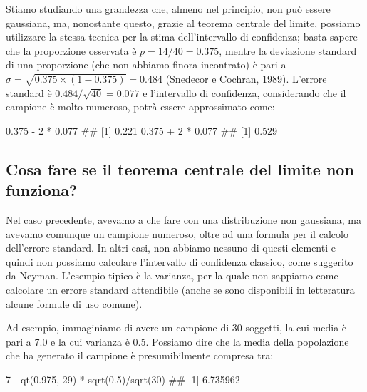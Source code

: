 \documentclass[a4paper,12pt,oneside]{book}
\newenvironment{Shaded}{\begin{snugshade}}{\end{snugshade}}
\newcommand{\DecValTok}[1]{#1}
\newcommand{\FloatTok}[1]{#1}
\newcommand{\SpecialCharTok}[1]{#1}
\newcommand{\DocumentationTok}[1]{#1}
\newcommand{\FunctionTok}[1]{#1}
\newcommand{\NormalTok}[1]{#1}
\begin{document}
Stiamo studiando una grandezza che, almeno nel principio, non può essere gaussiana, ma, nonostante questo, grazie al teorema centrale del limite, possiamo utilizzare la stessa tecnica per la stima dell'intervallo di confidenza; basta sapere che la proporzione osservata è \(p = 14/40 = 0.375\), mentre la deviazione standard di una proporzione (che non abbiamo finora incontrato) è pari a \(\sigma = \sqrt{0.375 \times (1 - 0.375)} = 0.484\) (Snedecor e Cochran, 1989). L'errore standard è \(0.484 / \sqrt{40} = 0.077\) e l'intervallo di confidenza, considerando che il campione è molto numeroso, potrà essere approssimato come:

\begin{Shaded}
\begin{Highlighting}[]
\FloatTok{0.375} \SpecialCharTok{{-}} \DecValTok{2} \SpecialCharTok{*} \FloatTok{0.077}
\DocumentationTok{\#\# [1] 0.221}
\FloatTok{0.375} \SpecialCharTok{+} \DecValTok{2} \SpecialCharTok{*} \FloatTok{0.077}
\DocumentationTok{\#\# [1] 0.529}
\end{Highlighting}
\end{Shaded}

\hypertarget{cosa-fare-se-il-teorema-centrale-del-limite-non-funziona}{%
\subsection{Cosa fare se il teorema centrale del limite non funziona?}\label{cosa-fare-se-il-teorema-centrale-del-limite-non-funziona}}

Nel caso precedente, avevamo a che fare con una distribuzione non gaussiana, ma avevamo comunque un campione numeroso, oltre ad una formula per il calcolo dell'errore standard. In altri casi, non abbiamo nessuno di questi elementi e quindi non possiamo calcolare l'intervallo di confidenza classico, come suggerito da Neyman. L'esempio tipico è la varianza, per la quale non sappiamo come calcolare un errore standard attendibile (anche se sono disponibili in letteratura alcune formule di uso comune).

Ad esempio, immaginiamo di avere un campione di 30 soggetti, la cui media è pari a 7.0 e la cui varianza è 0.5. Possiamo dire che la media della popolazione che ha generato il campione è presumibilmente compresa tra:

\begin{Shaded}
\begin{Highlighting}[]
\DecValTok{7} \SpecialCharTok{{-}} \FunctionTok{qt}\NormalTok{(}\FloatTok{0.975}\NormalTok{, }\DecValTok{29}\NormalTok{) }\SpecialCharTok{*} \FunctionTok{sqrt}\NormalTok{(}\FloatTok{0.5}\NormalTok{)}\SpecialCharTok{/}\FunctionTok{sqrt}\NormalTok{(}\DecValTok{30}\NormalTok{)}
\DocumentationTok{\#\# [1] 6.735962}
\end{Highlighting}
\end{Shaded}
\end{document}
